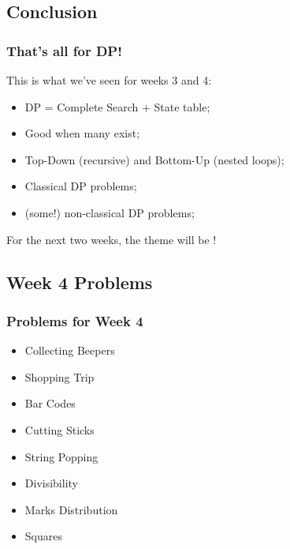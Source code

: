 \documentclass{beamer}
\begin{document}
\subsection{Conclusion}
\begin{frame}
  \frametitle{That's all for DP!}
  This is what we've seen for weeks 3 and 4:

  \begin{itemize}
  \item DP = Complete Search + State table;
  \item Good when many  exist;
  \item Top-Down (recursive) and Bottom-Up (nested loops);
  \item Classical DP problems;
  \item (some!) non-classical DP problems;
  \end{itemize}

  \vfill

  For the next two weeks, the theme will be !
\end{frame}

\subsection{Week 4 Problems}
\begin{frame}
  \frametitle{Problems for Week 4}
  \begin{itemize}
  \item Collecting Beepers
  \item Shopping Trip
  \item Bar Codes
  \item Cutting Sticks
  \item String Popping
  \item Divisibility
  \item Marks Distribution
  \item Squares
  \end{itemize}

\end{frame}
\end{document}
